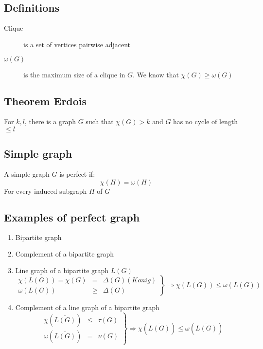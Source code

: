         \subsection{Definitions}
            \begin{description}
                \item[Clique] is a set of vertices pairwise adjacent
                \item[$\omega(G)$] is the maximum size of a clique in $G$. We know that $\chi(G)\geq\omega(G)$
            \end{description}
        \subsection{Theorem Erdois}
            For $k, l$, there is a graph $G$ such that $\chi(G)>k$ and $G$ has no cycle of length $\leq l$
        \subsection{Simple graph}
            A simple graph $G$ is perfect if:\\
            \[
                \chi(H)=\omega(H)
            \]
            For every induced subgraph $H$ of $G$
        \subsection{Examples of perfect graph}
            \begin{enumerate}
                \item Bipartite graph
                \item Complement of a bipartite graph\\
                \item Line graph of a bipartite graph $L(G)$\\
                    \[
                   \left.
                       \begin{array}{lcr}
                            \chi(L(G))=\chi(G)&=& \Delta(G)(Konig)\\
                            \omega(L(G)) &\geq& \Delta(G)
                        \end{array}
                    \right\} \Rightarrow \chi(L(G))\leq\omega(L(G))
                \]
                \item Complement of a line graph of a bipartite graph
                    \[
                   \left.
                       \begin{array}{lcr}
                           \chi(\overline{L(G)}) &\leq& \tau(G)\\
                           \omega(\overline{L(G)}) &=& \nu(G)
                        \end{array}
                    \right\} \Rightarrow \chi(\overline{L(G)})\leq\omega(\overline{L(G)})
                \]
            \end{enumerate}
